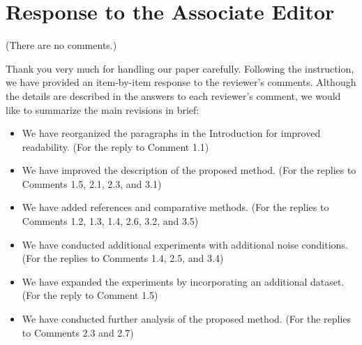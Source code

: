 \documentclass[a4paper,twocolumn]{article}
\begin{document}

\onecolumn
\section*{Response to the Associate Editor}
\begin{point1}
(There are no comments.)
\end{point1}


\begin{reply}
Thank you very much for handling our paper carefully. Following the instruction, we have provided an item-by-item response to the reviewer's comments. Although the details are described in the answers to each reviewer's comment, we would like to summarize the main revisions in brief:

\begin{itemize} 
	\item We have reorganized the paragraphs in the Introduction for improved readability. (For the reply to Comment 1.1)
	\item We have improved the description of the proposed method. (For the replies to Comments 1.5, 2.1, 2.3, and 3.1)
	\item We have added references and comparative methods. (For the replies to Comments 1.2, 1.3, 1.4, 2.6, 3.2, and 3.5)
	\item We have conducted additional experiments with additional noise conditions. (For the replies to Comments 1.4, 2.5, and 3.4)
	\item We have expanded the experiments by incorporating an additional dataset. (For the reply to Comment 1.5)
	\item We have conducted further analysis of the proposed method. (For the replies to Comments 2.3 and 2.7)
\end{itemize}

\end{reply}
\end{document}
